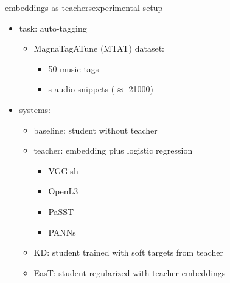 \begin{frame}{embeddings as teachers}{experimental setup}
            \begin{itemize}
                \item   task: auto-tagging
                    \begin{itemize}
                       \item   MagnaTagATune (MTAT) dataset:
													\begin{itemize}
															\item   50 music tags
															\item   \unit[30]{s} audio snippets ($\approx$ 21000)
													\end{itemize}
                    \end{itemize}
                \bigskip
                \item   systems:
                    \begin{itemize}
                        \item   baseline: student without teacher
                        \item   teacher: embedding plus logistic regression
														\begin{itemize}
															\item VGGish
															\item OpenL3
															\item PaSST
															\item PANNs
														\end{itemize}
												\item		KD: student trained with soft targets from teacher
												\item		EasT: student regularized with teacher embeddings
                    \end{itemize}
            \end{itemize}
\end{frame}

